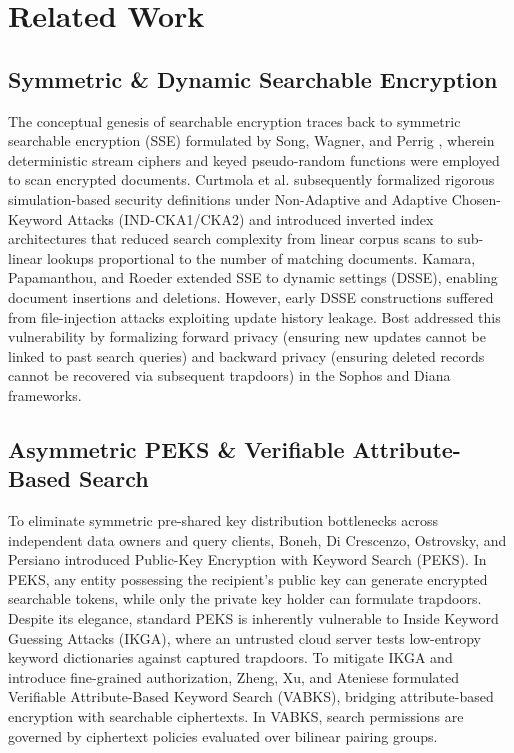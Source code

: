 \documentclass[journal,10pt,twocolumn]{IEEEtran}
\begin{document}
\section{Related Work}

\subsection{Symmetric \& Dynamic Searchable Encryption}
The conceptual genesis of searchable encryption traces back to symmetric searchable encryption (SSE) formulated by Song, Wagner, and Perrig \cite{song2000practical}, wherein deterministic stream ciphers and keyed pseudo-random functions were employed to scan encrypted documents. Curtmola et al. \cite{curtmola2011searchable} subsequently formalized rigorous simulation-based security definitions under Non-Adaptive and Adaptive Chosen-Keyword Attacks (IND-CKA1/CKA2) and introduced inverted index architectures that reduced search complexity from linear corpus scans to sub-linear lookups proportional to the number of matching documents. Kamara, Papamanthou, and Roeder \cite{kamara2012dynamic} extended SSE to dynamic settings (DSSE), enabling document insertions and deletions. However, early DSSE constructions suffered from file-injection attacks exploiting update history leakage. Bost \cite{bost2016sophos} addressed this vulnerability by formalizing forward privacy (ensuring new updates cannot be linked to past search queries) and backward privacy (ensuring deleted records cannot be recovered via subsequent trapdoors) in the Sophos and Diana frameworks.

\subsection{Asymmetric PEKS \& Verifiable Attribute-Based Search}
To eliminate symmetric pre-shared key distribution bottlenecks across independent data owners and query clients, Boneh, Di Crescenzo, Ostrovsky, and Persiano \cite{boneh2004peks} introduced Public-Key Encryption with Keyword Search (PEKS). In PEKS, any entity possessing the recipient's public key can generate encrypted searchable tokens, while only the private key holder can formulate trapdoors. Despite its elegance, standard PEKS is inherently vulnerable to Inside Keyword Guessing Attacks (IKGA), where an untrusted cloud server tests low-entropy keyword dictionaries against captured trapdoors. To mitigate IKGA and introduce fine-grained authorization, Zheng, Xu, and Ateniese \cite{zheng2014vabks} formulated Verifiable Attribute-Based Keyword Search (VABKS), bridging attribute-based encryption with searchable ciphertexts. In VABKS, search permissions are governed by ciphertext policies evaluated over bilinear pairing groups.
\end{document}
